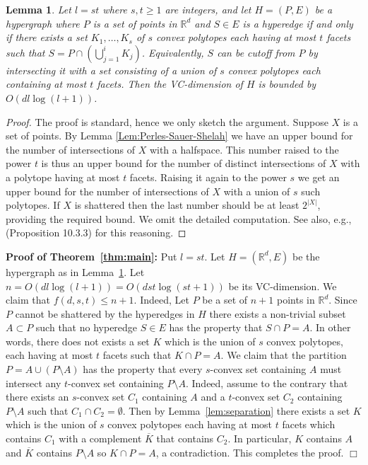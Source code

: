 \documentclass[11pt]{article}
\def\Re{\mathbb R}
\theoremstyle{plain}
\newtheorem{lemma}[theorem]{Lemma}
\theoremstyle{definition}
\theoremstyle{remark}
\begin{document}
 \begin{lemma}\label{lem:boolean-VC-dim}
    Let $l=st$ where $s,t \geq 1$ are integers,
	 and let $H=(P,E)$ be a hypergraph where
    $P$ is a set of points in $\Re^d$ and $S \in E$ is a hyperedge
    if and only if there exists a set $K_1,\ldots,K_s$ of $s$ convex
    polytopes each having at most
$t$ facets such that $S= P
    \cap (\bigcup_{j=1}^iK_j)$. Equivalently, $S$ can be cutoff from $P$ by
    intersecting it with a set consisting of a union of $s$ convex polytopes
    each containing at most $t$ facets. Then the VC-dimension of $H$ is bounded
    by $O(d l \log (l+1))$.
 \end{lemma}
 \begin{proof}
     The proof is standard, hence we only sketch the argument.
	Suppose $X$ is a set of points. By Lemma
	 \ref{Lem:Perles-Sauer-Shelah} we have an upper bound for the
	 number of intersections of $X$ with a halfspace. This number
	 raised to the power $t$ is thus an upper bound for the number 
	 of distinct intersections of $X$ with a polytope having at most
	 $t$ facets. Raising it again to the power $s$ we get an upper 
	 bound for the number of intersections of $X$ with a union of
	 $s$ such polytopes. If $X$ is shattered then the last number 
	 should be at least $2^{|X|}$, providing the required bound.
	 We omit the detailed computation.
	 See also, e.g., \cite{MATOUSEK}(Proposition 10.3.3) for this
	 reasoning.
 \end{proof}

{\noindent \bf Proof of Theorem~\ref{thm:main}:}
Put $l = st$. Let  $H=(\Re^d,E)$ be the hypergraph as in
Lemma~\ref{lem:boolean-VC-dim}. Let $n=O(d l \log (l+1))= O(d st \log (st+1))$
be its VC-dimension. We claim that $f(d,s,t) \leq n+1$. Indeed, Let $P$
be a set of $n+1$ points in $\Re^d$. Since $P$ cannot be shattered by
the hyperedges in $H$ there exists a non-trivial subset $A \subset P$
such that no hyperedge $S \in E$ has the property that $S\cap P= A$. In
other words, there does not exists a set $K$ which is the union of $s$ 
convex
polytopes, each having at most $t$ facets such that $K\cap P = A$. We
claim that the partition $P=A \cup (P\setminus A)$ has the property that
every $s$-convex set containing $A$ must intersect any $t$-convex set
containing  $P\setminus A$. Indeed, assume to the contrary that there
exists an $s$-convex set $C_1$ containing $A$ and a $t$-convex set $C_2$
containing $P\setminus A$ such that $C_1 \cap C_2 = \emptyset$. Then by
Lemma~\ref{lem:separation} there exists a set $K$ which is the union of
$s$ convex polytopes each having at most $t$ facets which contains $C_1$
with a complement $\overline{K}$ that contains $C_2$. In particular, $K$
contains $A$ and $\overline{K}$ contains $P \setminus A$ so $K \cap P =
A$, a contradiction. This completes the proof. \hfill $\Box$
\end{document}
